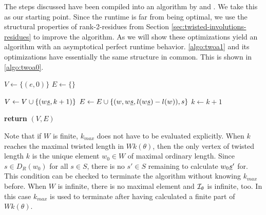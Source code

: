 The steps discussed have been compiled into an algorithm by \cite[Algorithm 2.4]{brennemann:twoa} and \cite[Algorithm 3.1.1]{haas:twoa}. We take this as our starting point. Since the runtime is far from being optimal, we use the structural properties of rank-2-residues from Section \ref{sec:twisted-involutions-residues} to improve the algorithm. As we will show these optimizations yield an algorithm with an asymptotical perfect runtime behavior. \ref{algo:twoa1} and its optimizations have essentially the same structure in common. This is shown in \ref{algo:twoa0}.

\begin{algo}[TWOABase]
	\hfill
	\begin{algorithmic}[1]
	\State $V \gets \{(e,0)\}$
	\State $E \gets \{\}$

	 \label{algo:twoa0-k-loop}
		 \label{algo:twoa0-v-loop}
			 \label{algo:twoa0-s-loop} 
				 \label{algo:twoa0-decision} 
					\State $V \gets V \cup \{ (w \underline{s},k+1) \}$
				\EndIf
				\State $E \gets E \cup \{ (w,w \underline{s},l(w \underline{s}) - l(w)),s \}$
			\EndFor
		\EndFor
		\State $k \gets k + 1$
	\EndFor

	\State \textbf{return} $(V,E)$
	\EndProcedure
	\end{algorithmic}
\end{algo}

\begin{rema}
	Note that if $W$ is finite, $k_{max}$ does not have to be evaluated explicitly. When $k$ reaches the maximal twisted length in $Wk(\theta)$, then the only vertex of twisted length $k$ is the unique element $w_0 \in W$ of maximal ordinary length. Since $s \in D_R(w_0)$ for all $s \in S$, there is no $s' \in S$ remaining to calculate $w_0 \underline{s}'$ for. This condition can be checked to terminate the algorithm without knowing $k_{max}$ before. When $W$ is infinite, there is no maximal element and $\mathcal{I}_{\theta}$ is infinite, too. In this case $k_{max}$ is used to terminate after having calculated a finite part of $Wk(\theta)$.
\end{rema}

